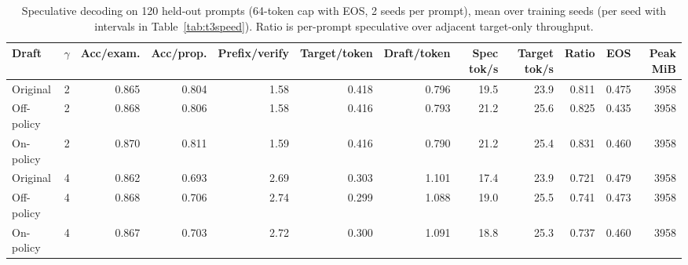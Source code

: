 \begin{table}[!htb]
\centering
\scriptsize
\setlength{\tabcolsep}{3.5pt}
\caption{Speculative decoding on 120 held-out prompts (64-token cap with EOS, 2 seeds per prompt), mean over training seeds (per seed with intervals in Table~\ref{tab:t3speed}). Ratio is per-prompt speculative over adjacent target-only throughput.}
\label{tab:t3speedmean}
\begin{adjustbox}{max width=\linewidth}
\begin{tabular}{lrrrrrrrrrrr}
\toprule
Draft & $\gamma$ & Acc/exam. & Acc/prop. & Prefix/verify & Target/token & Draft/token & Spec tok/s & Target tok/s & Ratio & EOS & Peak MiB \\
\midrule
Original & 2 & 0.865 & 0.804 & 1.58 & 0.418 & 0.796 & 19.5 & 23.9 & 0.811 & 0.475 & 3958 \\
Off-policy & 2 & 0.868 & 0.806 & 1.58 & 0.416 & 0.793 & 21.2 & 25.6 & 0.825 & 0.435 & 3958 \\
On-policy & 2 & 0.870 & 0.811 & 1.59 & 0.416 & 0.790 & 21.2 & 25.4 & 0.831 & 0.460 & 3958 \\
\midrule
Original & 4 & 0.862 & 0.693 & 2.69 & 0.303 & 1.101 & 17.4 & 23.9 & 0.721 & 0.479 & 3958 \\
Off-policy & 4 & 0.868 & 0.706 & 2.74 & 0.299 & 1.088 & 19.0 & 25.5 & 0.741 & 0.473 & 3958 \\
On-policy & 4 & 0.867 & 0.703 & 2.72 & 0.300 & 1.091 & 18.8 & 25.3 & 0.737 & 0.460 & 3958 \\
\bottomrule
\end{tabular}
\end{adjustbox}
\end{table}
